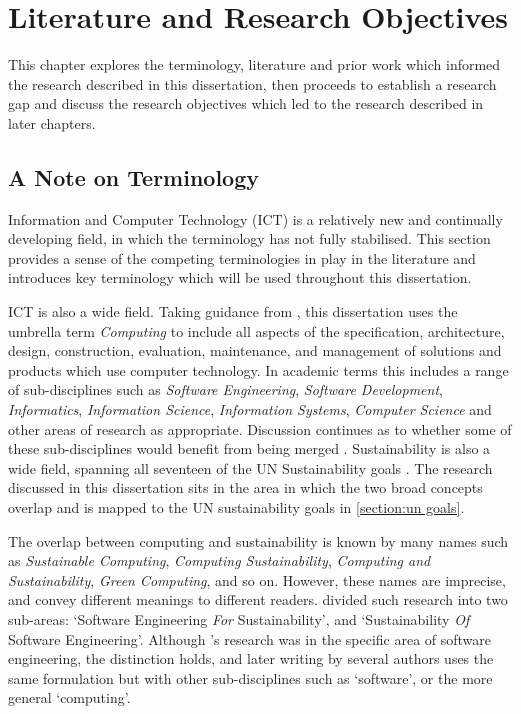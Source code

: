 \chapter{Literature and Research Objectives}
\label{chapter:questions}

This chapter explores the terminology, literature and prior work which informed the research described in this dissertation, then proceeds to establish a research gap and discuss the research objectives which led to the research described in later chapters.

\section{A Note on Terminology}
\label{section:terminology}

Information and Computer Technology (ICT) is a relatively new and continually developing field, in which the terminology has not fully stabilised. This section provides a sense of the competing terminologies in play in the literature and introduces key terminology which will be used throughout this dissertation.

ICT is also a wide field. Taking guidance from \citet{Denning1989}, this dissertation uses the umbrella term \emph{Computing} to include all aspects of the specification, architecture, design, construction, evaluation, maintenance, and management of solutions and products which use computer technology. In academic terms this includes a range of sub-disciplines such as \emph{Software Engineering}, \emph{Software Development}, \emph{Informatics}, \emph{Information Science}, \emph{Information Systems}, \emph{Computer Science} and other areas of research as appropriate. Discussion continues as to whether some of these sub-disciplines would benefit from being merged \citep{Fitzgerald2024}. Sustainability is also a wide field, spanning all seventeen of the UN Sustainability goals \citep{UnitedNations2015}. The research discussed in this dissertation sits in the area in which the two broad concepts overlap and is mapped to the UN sustainability goals in \autoref{section:un goals}.

The overlap between computing and sustainability is known by many names such as \emph{Sustainable Computing}, \emph{Computing Sustainability}, \emph{Computing and Sustainability}, \emph{Green Computing}, and so on. However, these names are imprecise, and convey different meanings to different readers. \textcite{Penzenstadler2013} divided such research into two sub-areas: `Software Engineering \emph{For} Sustainability', and `Sustainability \emph{Of} Software Engineering'. Although \citeauthor{Penzenstadler2013}'s research was in the specific area of software engineering, the distinction holds, and later writing by several authors uses the same formulation but with other sub-disciplines such as `software', or the more general `computing'.

